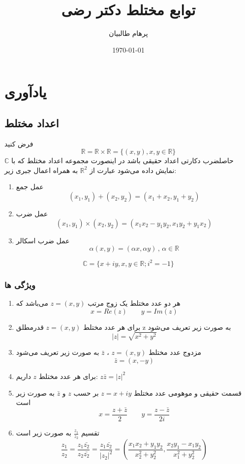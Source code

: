 \documentclass[12pt]{report}
\begin{document}
	
	
	\title{توابع مختلط دکتر رضی}
	\author{پرهام طالبیان}
	\date{\today}
	\maketitle
	
	

	\tableofcontents
	\chapter{یادآوری}
	
	\section{اعداد مختلط}
	فرض کنید
	$$\mathbb{R} = \mathbb{R} \times \mathbb{R} = \{(x, y), x, y \in \mathbb{R}\}$$
	حاصلضرب دکارتی اعداد حقیقی باشد در اینصورت مجموعه اعداد مختلط که با
	$\mathbb{C}$
	نمایش داده می‌شود عبارت از 
	$\mathbb{R}^2$
	به همراه اعمال جبری زیر:
	\begin{enumerate}
		\item 
		عمل جمع
		$$(x_1,y_1) + (x_2,y_2) = (x_1+x_2, y_1+y_2)$$
		\item
		عمل ضرب
		$$(x_1,y_1) \times (x_2,y_2) = (x_1x_2 - y_1 y_2, x_1y_2+y_1x_2)$$
		\item
		عمل ضرب اسکالر
		$$\alpha(x, y) = (\alpha x , \alpha y) \,,\, \alpha \in \mathbb{R}$$

	\end{enumerate}
	
	$$\mathbb{C} = \{x+iy, x, y \in \mathbb{R} ; i^2 = -1\}$$
	\subsection{ویژگی ها}
	\begin{enumerate}
		\item 
		هر دو عدد مختلط یک زوج مرتب 
		$z=(x, y)$
		می‌باشد که
		$$x = Re(z) \qquad y = Im(z)$$
		\item
		برای هر عدد مختلط
		$z = (x, y)$
		قدرمطلق z به صورت زیر تعریف می‌شود
		$$|z| = \sqrt{x^2+y^2}$$
		\item
		مزدوج عدد مختلط 
		$z=(x, y)$
		،
		$\bar{z}$
		به صورت زیر تعریف می‌شود
		$$\bar{z} =(x, -y)$$
		\item
		برای هر عدد مختلط  
		$z$
		داریم:
		$z \bar{z} = |z|^2\qquad$
		\item
		قسمت حقیقی و موهومی عدد مختلط
		$z = x+iy$
		بر حسب 
		$z$
		و
		$\bar{z}$
		به صورت زیر است
		$$x=\frac{z+\bar{z}}{2} \qquad y=\frac{z - \bar{z}}{2i}$$
		\item
		تقسیم
		$\frac{z_1}{z_2}$
		به صورت زیر است
		$$\frac{z_1}{z_2} = \frac{z_1\bar{z_2}}{z_2\bar{z_2}} = \frac{z_1\bar{z_2}}{|z_2|^2} = (\frac{x_1x_2+y_1y_2}{x_2^2+y_2^2}, \frac{x_2y_1 - x_1y_2}{x_1^2+y_2^2})$$
	\end{enumerate}
	
\end{document}
